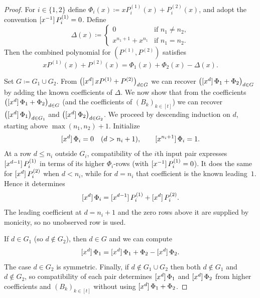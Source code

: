 \begin{proof}
    For $i\in\{1,2\}$ define $\Phi_i(x)\coloneqq xP^{(1)}_i(x)+P^{(2)}_i(x)$, and adopt the convention $\coeff{P^{(1)}_i}{-1}=0$.
    Define
    \[
        \Delta(x)\coloneqq
        \begin{cases}
            0 & \text{if } n_1\ne n_2,\\
            x^{n_1+1}+x^{n_1} & \text{if } n_1=n_2.
        \end{cases}
    \]
    Then the combined polynomial for $(P^{(1)},P^{(2)})$ satisfies
    \[
        xP^{(1)}(x)+P^{(2)}(x)=\Phi_1(x)+\Phi_2(x)-\Delta(x).
    \]

    Set $G\coloneqq G_1\cup G_2$. From $\bigl(\coeff{xP^{(1)}+P^{(2)}}{d}\bigr)_{d\in G}$ we can recover $\bigl(\coeff{\Phi_1+\Phi_2}{d}\bigr)_{d\in G}$ by adding the known coefficients of $\Delta$.
    We now show that from the coefficients $\bigl(\coeff{\Phi_1+\Phi_2}{d}\bigr)_{d\in G}$ (and the coefficients of $(B_k)_{k\in[t]}$) we can recover $\bigl(\coeff{\Phi_1}{d}\bigr)_{d\in G_1}$ and $\bigl(\coeff{\Phi_2}{d}\bigr)_{d\in G_2}$.
    We proceed by descending induction on $d$, starting above
    $\max(n_1,n_2)+1$.  Initialize
    \[
      \coeff{\Phi_i}{d}=0\quad(d>n_i+1),\qquad
      \coeff{\Phi_i}{n_i+1}=1.
    \]
    At a row $d\le n_i$ outside $G_i$, compatibility of the $i$th input pair
    expresses $\coeff{P^{(1)}_i}{d-1}$ in terms of its higher
    $\Phi_i$-rows (with $\coeff{P^{(1)}_i}{-1}=0$).  It does the same for
    $\coeff{P^{(2)}_i}{d}$ when $d<n_i$, while for $d=n_i$ that coefficient
    is the known leading~$1$.  Hence it determines
    \[
      \coeff{\Phi_i}{d}
       =\coeff{P^{(1)}_i}{d-1}+\coeff{P^{(2)}_i}{d}.
    \]
    The leading coefficient at $d=n_i+1$ and the zero rows above it are
    supplied by monicity, so no unobserved row is used.

    If $d\in G_1$ (so $d\notin G_2$), then $d\in G$ and we can compute
    \[
        \coeff{\Phi_1}{d}=\coeff{\Phi_1+\Phi_2}{d}-\coeff{\Phi_2}{d}.
    \]
    The case $d\in G_2$ is symmetric.
    Finally, if $d\notin G_1\cup G_2$ then both $d\notin G_1$ and $d\notin G_2$, so compatibility of each pair determines $\coeff{\Phi_1}{d}$ and $\coeff{\Phi_2}{d}$ from higher coefficients and $(B_k)_{k\in[t]}$ without using $\coeff{\Phi_1+\Phi_2}{d}$.


\end{proof}

